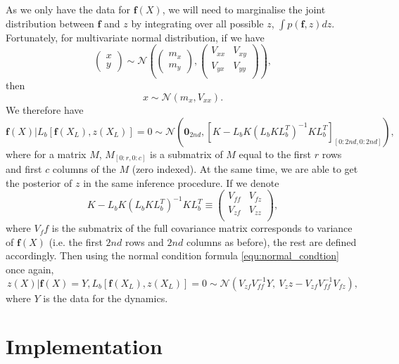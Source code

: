 \documentclass{statsmsc}
\begin{document}
As we only have the data for $\mathbf{f}(X)$, we will need to marginalise the joint distribution between $\mathbf{f}$ and $z$ by integrating over all possible $z$, $\int p(\mathbf{f},z) dz$.
Fortunately, for multivariate normal distribution, if we have
$$
\begin{pmatrix}
  x \\ y
\end{pmatrix}
\sim\mathcal{N}
\left(
  \begin{pmatrix}
    m_x \\ m_y 
  \end{pmatrix},
\begin{pmatrix}
  V_{xx} & V_{xy} \\ V_{yx} & V_{yy} \\
\end{pmatrix}
\right),
$$
then 
$$
x\sim\mathcal{N}(m_x, V_{xx}).
$$
We therefore have 
$$
\mathbf{f}(X)|L_b[\mathbf{f}(X_L), z(X_L)]=0 \sim \mathcal{N}(\mathbf{0}_{2nd}, [K-L_bK(L_bKL_b^T)^{-1}KL_b^T]_{[0:2nd, 0:2nd]}),
$$
where for a matrix $M$, $M_{[0:r,0:c]}$ is a submatrix of $M$ equal to the first $r$ rows and first $c$ columns of the $M$ (zero indexed).
At the same time, we are able to get the posterior of $z$ in the same inference procedure. 
If we denote 
$$
K-L_bK(L_bKL_b^T)^{-1}KL_b^T \equiv \begin{pmatrix}
  V_{ff} & V_{fz} \\ V_{zf} & V_{zz} \\
\end{pmatrix},
$$
where $V_ff$ is the submatrix of the full covariance matrix corresponds to variance of $\mathbf{f}(X)$ (i.e. the first $2nd$ rows and $2nd$ columns as before), the rest are defined accordingly.  
Then using the normal condition formula \ref{equ:normal_condtion} once again, 
$$
z(X)|\mathbf{f}(X)=Y, L_b[\mathbf{f}(X_L), z(X_L)]=0
\sim\mathcal{N}
(V_{zf}V_{ff}^{-1}Y,\ V_zz-V_{zf}V_{ff}^{-1}V_{fz}),
$$
where $Y$ is the data for the dynamics.

\chapter{Implementation}
\end{document}
